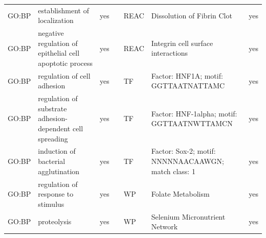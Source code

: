 \begin{longtable}{@{}lp{5cm}lllp{5cm}l@{}}
GO:BP           & establishment of localization                                                                                                      & yes              &           & REAC            & Dissolution of Fibrin Clot                                                                                                                                             & yes              \\
GO:BP           & negative regulation of epithelial cell apoptotic process                                                                           & yes              &           & REAC            & Integrin cell surface interactions                                                                                                                                     & yes              \\
GO:BP           & regulation of cell adhesion                                                                                                        & yes              &           & TF              & Factor: HNF1A; motif: GGTTAATNATTAMC                                                                                                                                   & yes              \\
GO:BP           & regulation of substrate adhesion-dependent cell spreading                                                                          & yes              &           & TF              & Factor: HNF-1alpha; motif: GGTTAATNWTTAMCN                                                                                                                             & yes              \\
GO:BP           & induction of bacterial agglutination                                                                                               & yes              &           & TF              & Factor: Sox-2; motif: NNNNNAACAAWGN; match class: 1                                                                                                                    & yes              \\
GO:BP           & regulation of response to stimulus                                                                                                 & yes              &           & WP              & Folate Metabolism                                                                                                                                                      & yes              \\
GO:BP           & proteolysis                                                                                                                        & yes              &           & WP              & Selenium Micronutrient Network                                                                                                                                         & yes              \\

\end{longtable}
